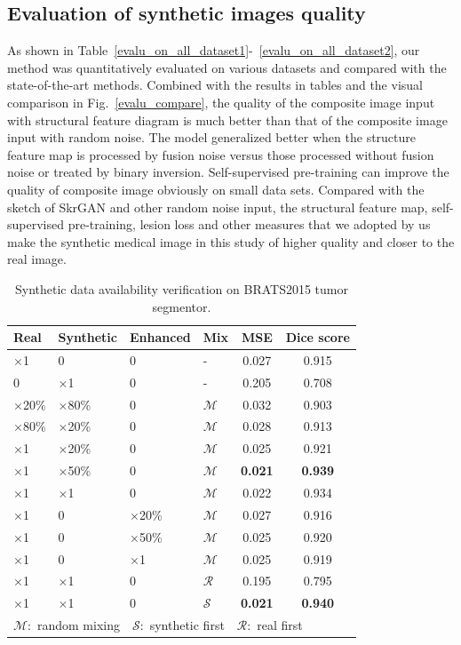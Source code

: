 \documentclass[runningheads]{llncs}
\begin{document}
	\subsection{Evaluation of synthetic images quality }
	As shown in Table~\ref{evalu_on_all_dataset1}-~\ref{evalu_on_all_dataset2}, our method was quantitatively evaluated on various datasets and compared with the state-of-the-art methods. Combined with the results in tables and the visual comparison in Fig.~\ref{evalu_compare}, the quality of the composite image input with structural feature diagram is much better than that of the composite image input with random noise. The model generalized better when the structure feature map is processed by fusion noise versus those processed without fusion noise or treated by binary inversion. Self-supervised pre-training can improve the quality of composite image obviously on small data sets. Compared with the sketch of SkrGAN and other random noise input, the structural feature map, self-supervised pre-training, lesion loss and other measures that we adopted by us make the synthetic medical image in this study of higher quality and closer to the real image.
	\begin{table}
		\begin{center}
			{\caption{Synthetic data availability verification on BRATS2015 tumor  segmentor.}\label{availability_test}}
			\begin{tabular}{llllcc}
				\hline
				Real &Synthetic & Enhanced & Mix  & MSE &Dice score\\
				\hline		
				$\times$1      & 0 		&0 			&- &0.027 &0.915 \\
				0 	 	        & $\times$1  	&0 			&- &0.205 &0.708 \\	
				$\times$20\% 	& $\times$80\% 	&0  		&$\mathcal{M}$ &0.032 &0.903 \\
				$\times$80\% 	& $\times$20\% 	&0  		&$\mathcal{M}$ &0.028 &0.913 \\
				$\times$1 	 	& $\times$20\% &0  		&$\mathcal{M}$ &0.025 &0.921 \\
				$\times$1 	 	& $\times$50\% &0  		&$\mathcal{M}$ &\textbf{0.021} &\textbf{0.939} \\
				$\times$1 	 	& $\times$1    &0   		&$\mathcal{M}$ &0.022 &0.934 \\
				$\times$1 	 	&0 		&  $\times$20\%	 	&$\mathcal{M}$ &0.027 &0.916 \\
				$\times$1 	 	&0 		&  $\times$50\% 	&$\mathcal{M}$ &0.025 &0.920 \\
				$\times$1 	 	&0 		&  $\times$1    &$\mathcal{M}$ &0.025 &0.919 \\
				$\times$1 	 	& $\times$1 	&0  		&$\mathcal{R}$ &0.195 &0.795 \\
				$\times$1 	 	& $\times$1 	&0  		&$\mathcal{S}$ &\textbf{0.021} &\textbf{0.940}
				\\
				\hline
				\multicolumn{6}{l}{$\mathcal{M}:$ random mixing\ \
					$\mathcal{S}:$ synthetic first\ \
					$\mathcal{R}:$ real first}
			\end{tabular}
		\end{center}
	\end{table}
\end{document}
